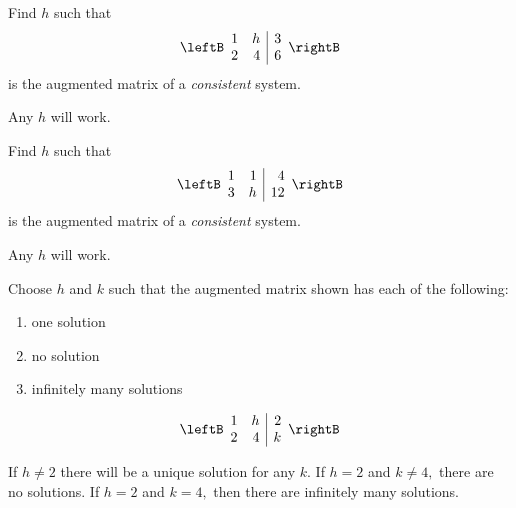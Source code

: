 \begin{enumialphparenastyle}
\begin{ex}
Find $h$ such that
\begin{equation*}
\leftB
\begin{array}{rr|r}
1 & h & 3 \\
2 & 4 & 6
\end{array}
\rightB
\end{equation*}
is the augmented matrix of a \textit{consistent} system. 
\begin{sol}
 Any $h$ will work.
\end{sol}
\end{ex}

\begin{ex}
Find $h$ such that
\begin{equation*}
\leftB
\begin{array}{rr|r}
1 & 1 & 4 \\
3 & h & 12
\end{array}
\rightB
\end{equation*}
is the augmented matrix of a \textit{consistent} system. 
\begin{sol}
 Any $h$ will work.
\end{sol}
\end{ex}


\begin{ex}
Choose $h$ and $k$ such that the augmented matrix shown has each of the following: 
\begin{enumerate}
\item one solution
\item no solution
\item infinitely many solutions
\end{enumerate}
\begin{equation*}
\leftB
\begin{array}{rr|r}
1 & h & 2 \\
2 & 4 & k
\end{array}
\rightB 
\end{equation*}
\begin{sol}
If $h\neq 2$ there will be a unique solution for any $k$. If $h=2$ and $%
k\neq 4,$ there are no solutions. If $h=2$ and $k=4,$ then there are
infinitely many solutions.
\end{sol}
\end{ex}



\end{enumialphparenastyle}
